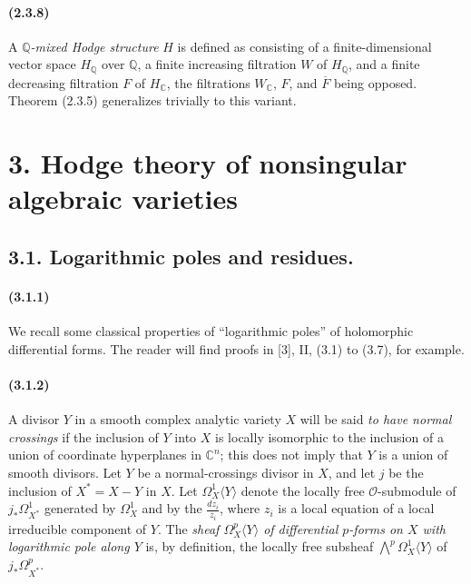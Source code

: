 \documentclass[10pt]{article}
\newcommand{\C}{\mathbb C}
\newcommand{\Q}{\mathbb Q}
\providecommand{\cO}{\mathcal O}
\providecommand{\cO}{\mathcal O}
\begin{document}
\paragraph{(2.3.8)} A \emph{$\Q$-mixed Hodge structure} $H$ is defined as consisting of a finite-dimensional vector space $H_\Q$ over $\Q$, a finite increasing filtration $W$ of $H_\Q$, and a finite decreasing filtration $F$ of $H_\C$, the filtrations $W_\C$, $F$, and $\overline F$ being opposed. Theorem (2.3.5) generalizes trivially to this variant.

\section*{3. Hodge theory of nonsingular algebraic varieties}

\subsection*{3.1. Logarithmic poles and residues.}

\paragraph{(3.1.1)} We recall some classical properties of ``logarithmic poles'' of holomorphic differential forms. The reader will find proofs in [3], II, (3.1) to (3.7), for example.

\paragraph{(3.1.2)} A divisor $Y$ in a smooth complex analytic variety $X$ will be said \emph{to have normal crossings} if the inclusion of $Y$ into $X$ is locally isomorphic to the inclusion of a union of coordinate hyperplanes in $\C^n$; this does not imply that $Y$ is a union of smooth divisors. Let $Y$ be a normal-crossings divisor in $X$, and let $j$ be the inclusion of $X^*=X-Y$ in $X$. Let $\Omega_X^1\langle Y\rangle$ denote the locally free $\cO$-submodule of $j_*\Omega_{X^*}^1$ generated by $\Omega_X^1$ and by the $\frac{dz_i}{z_i}$, where $z_i$ is a local equation of a local irreducible component of $Y$. The \emph{sheaf $\Omega_X^p\langle Y\rangle$ of differential $p$-forms on $X$ with logarithmic pole along $Y$} is, by definition, the locally free subsheaf $\bigwedge^p\Omega_X^1\langle Y\rangle$ of $j_*\Omega_{X^*}^p$.
\end{document}
